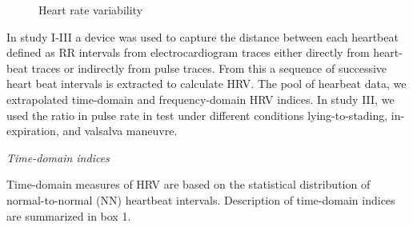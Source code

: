 \documentclass[
  a4paper,
  headsepline=true,
  open=any]{scrbook}
\begin{document}
\begin{figure}

\begin{minipage}[t]{\linewidth}

{\centering 


\caption{Heart rate variability}

}

\end{minipage}%

\end{figure}

In study I-III a device was used to capture the distance between each
heartbeat defined as RR intervals from electrocardiogram traces either
directly from heart-beat traces or indirectly from pulse traces. From
this a sequence of successive heart beat intervals is extracted to
calculate HRV. The pool of hearbeat data, we extrapolated time-domain
and frequency-domain HRV indices. In study III, we used the ratio in
pulse rate in test under different conditions lying-to-stading, in-
expiration, and valsalva maneuvre.

\emph{Time-domain indices}

Time-domain measures of HRV are based on the statistical distribution of
normal-to-normal (NN) heartbeat intervals. Description of time-domain
indices are summarized in box 1.
\end{document}
